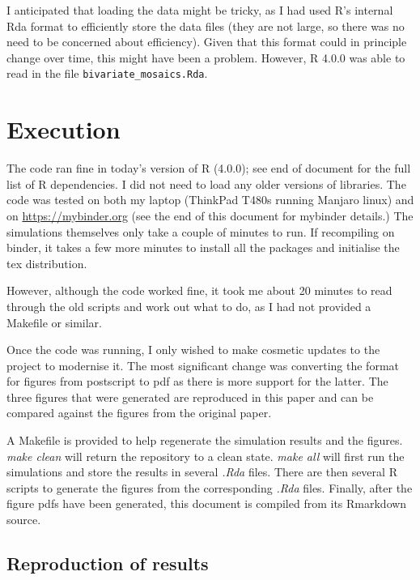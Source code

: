 \documentclass[
]{article}
\begin{document}
I anticipated that loading the data might be tricky, as I had used R's
internal Rda format to efficiently store the data files (they are not
large, so there was no need to be concerned about efficiency). Given
that this format could in principle change over time, this might have
been a problem. However, R 4.0.0 was able to read in the file
\texttt{bivariate\_mosaics.Rda}.

\hypertarget{execution}{%
\section{Execution}\label{execution}}

The code ran fine in today's version of R (4.0.0); see end of document
for the full list of R dependencies. I did not need to load any older
versions of libraries. The code was tested on both my laptop (ThinkPad
T480s running Manjaro linux) and on \url{https://mybinder.org} (see the
end of this document for mybinder details.) The simulations themselves
only take a couple of minutes to run. If recompiling on binder, it takes
a few more minutes to install all the packages and initialise the tex
distribution.

However, although the code worked fine, it took me about 20 minutes to
read through the old scripts and work out what to do, as I had not
provided a Makefile or similar.

Once the code was running, I only wished to make cosmetic updates to the
project to modernise it. The most significant change was converting the
format for figures from postscript to pdf as there is more support for
the latter. The three figures that were generated are reproduced in this
paper and can be compared against the figures from the original paper.

A Makefile is provided to help regenerate the simulation results and the
figures. \emph{make clean} will return the repository to a clean state.
\emph{make all} will first run the simulations and store the results in
several \emph{.Rda} files. There are then several R scripts to generate
the figures from the corresponding \emph{.Rda} files. Finally, after the
figure pdfs have been generated, this document is compiled from its
Rmarkdown source.

\hypertarget{reproduction-of-results}{%
\subsection{Reproduction of results}\label{reproduction-of-results}}
\end{document}
